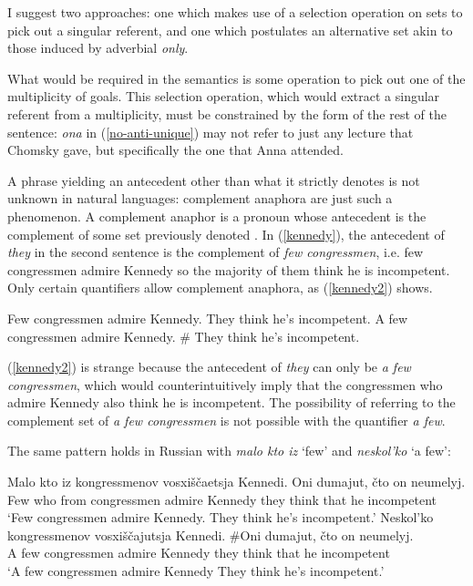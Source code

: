 I suggest two approaches: one which makes use of a selection operation on sets to pick out a singular referent, and one which postulates an alternative set akin to those induced by adverbial \textit{only}.

What would be required in the semantics is some operation to pick out one of the multiplicity of goals. This selection operation, which would extract a singular referent from a multiplicity, must be constrained by the form of the rest of the sentence: \textit{ona} in (\ref{no-anti-unique}) may not refer to just any lecture that Chomsky gave, but specifically the one that Anna attended.

A phrase yielding an antecedent other than what it strictly denotes is not unknown in natural languages: complement anaphora are just such a phenomenon. A complement anaphor is a pronoun whose antecedent is the complement of some set previously denoted \citep{nouwen03, schwarz09}. In (\ref{kennedy}), the antecedent of \textit{they} in the second sentence is the complement of \textit{few congressmen}, i.e. few congressmen admire Kennedy so the majority of them think he is incompetent. Only certain quantifiers allow complement anaphora, as (\ref{kennedy2}) shows.

\begin{exe}
	\ex \label{kennedy} Few congressmen admire Kennedy. They think he's incompetent.
	\ex \label{kennedy2} A few congressmen admire Kennedy. \# They think he's incompetent.
\end{exe}

(\ref{kennedy2}) is strange because the antecedent of \textit{they} can only be \textit{a few congressmen}, which would counterintuitively imply that the congressmen who admire Kennedy also think he is incompetent. The possibility of referring to the complement set of \textit{a few congressmen} is not possible with the quantifier \textit{a few}.

The same pattern holds in Russian with \textit{malo kto iz} `few' and \textit{neskol'ko} `a few':

\begin{exe}
	\ex \gll Malo kto iz kongressmenov vosxi\v{s}\v{c}aetsja Kennedi. Oni dumajut, \v{c}to on neumelyj.\\
	Few who from congressmen admire Kennedy they think that he incompetent\\
	\glt `Few congressmen admire Kennedy. They think he's incompetent.'
	\ex \gll Neskol'ko kongressmenov vosxi\v{s}\v{c}ajutsja Kennedi. \#Oni dumajut, \v{c}to on neumelyj.\\
	{A few} congressmen admire Kennedy they think that he incompetent\\
	\glt `A few congressmen admire Kennedy They think he's incompetent.'
\end{exe}

